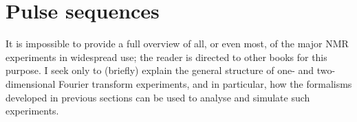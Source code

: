 \section{Pulse sequences}
\label{sec:theory__pulse_sequences}

It is impossible to provide a full overview of all, or even most, of the major NMR experiments in widespread use; the reader is directed to other books for this purpose.
I seek only to (briefly) explain the general structure of one- and two-dimensional Fourier transform experiments, and in particular, how the formalisms developed in previous sections can be used to analyse and simulate such experiments.








